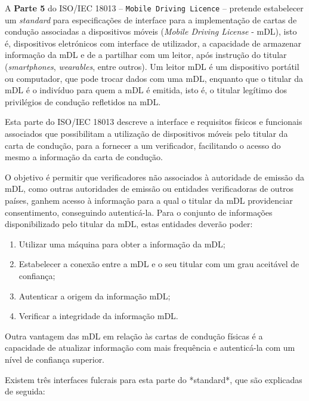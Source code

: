 A \textbf{Parte 5} do ISO/IEC 18013 -- \texttt{Mobile Driving Licence} -- pretende estabelecer um \textit{standard} para especificações de interface para a implementação de cartas de condução associadas a dispositivos móveis (\textit{Mobile Driving License} - mDL), isto é, dispositivos eletrónicos com interface de utilizador, a capacidade de armazenar informação da mDL e de a partilhar com um leitor, após instrução do titular (\textit{smartphones}, \textit{wearables}, entre outros). Um leitor mDL é um dispositivo portátil ou computador, que pode trocar dados com uma mDL, enquanto que o titular da mDL é o indivíduo para quem a mDL é emitida, isto é, o titular legítimo dos privilégios de condução refletidos na mDL.

Esta parte do ISO/IEC 18013 descreve a interface e requisitos físicos e funcionais associados que possibilitam a utilização de dispositivos móveis pelo titular da carta de condução, para a fornecer a um verificador, facilitando o acesso do mesmo a informação da carta de condução.

O objetivo é permitir que verificadores não associados à autoridade de emissão da mDL, como outras autoridades de emissão ou entidades verificadoras de outros países, ganhem acesso à informação para a qual o titular da mDL providenciar consentimento, conseguindo autenticá-la. Para o conjunto de informações disponibilizado pelo titular da mDL, estas entidades deverão poder:

\begin{enumerate}
	\item Utilizar uma máquina para obter a informação da mDL;
	\item Estabelecer a conexão entre a mDL e o seu titular com um grau aceitável de confiança;
	\item Autenticar a origem da informação mDL;
	\item Verificar a integridade da informação mDL.
\end{enumerate}

Outra vantagem das mDL em relação às cartas de condução físicas é a capacidade de atualizar informação com mais frequência e autenticá-la com um nível de confiança superior.

Existem três interfaces fulcrais para esta parte do *standard*, que são explicadas de seguida:

